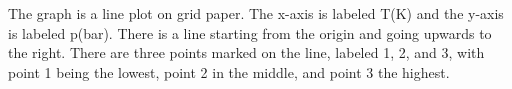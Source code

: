 The graph is a line plot on grid paper. The x-axis is labeled T(K) and the y-axis is labeled p(bar). There is a line starting from the origin and going upwards to the right. There are three points marked on the line, labeled 1, 2, and 3, with point 1 being the lowest, point 2 in the middle, and point 3 the highest.